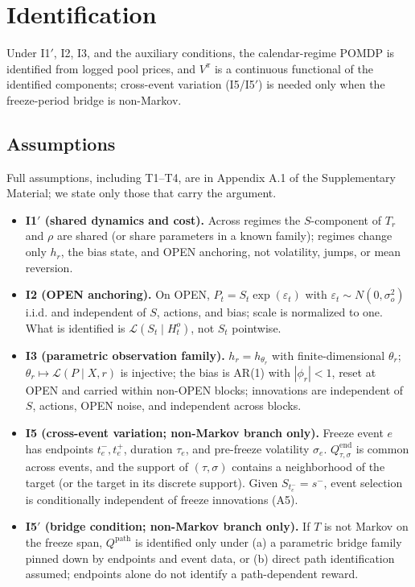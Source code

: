 \section{Identification}\label{sec:identification}

Under I1$'$, I2, I3, and the auxiliary conditions, the calendar-regime POMDP is identified from logged pool prices, and $V^\pi$ is a continuous functional of the identified components; cross-event variation (I5/I5$'$) is needed only when the freeze-period bridge is non-Markov.

\subsection{Assumptions}

Full assumptions, including T1--T4, are in Appendix A.1 of the Supplementary Material; we state only those that carry the argument.

\begin{itemize}
\item \textbf{I1$'$ (shared dynamics and cost).} Across regimes the $S$-component of $T_r$ and $\rho$ are shared (or share parameters in a known family); regimes change only $h_r$, the bias state, and OPEN anchoring, not volatility, jumps, or mean reversion.
\item \textbf{I2 (OPEN anchoring).} On OPEN, $P_t=S_t\exp(\varepsilon_t)$ with $\varepsilon_t\sim N(0,\sigma_o^2)$ i.i.d. and independent of $S$, actions, and bias; scale is normalized to one. What is identified is $\mathcal L(S_t\mid H_t^o)$, not $S_t$ pointwise.
\item \textbf{I3 (parametric observation family).} $h_r=h_{\theta_r}$ with finite-dimensional $\theta_r$; $\theta_r\mapsto\mathcal L(P\mid X,r)$ is injective; the bias is AR(1) with $|\phi_r|<1$, reset at OPEN and carried within non-OPEN blocks; innovations are independent of $S$, actions, OPEN noise, and independent across blocks.
\item \textbf{I5 (cross-event variation; non-Markov branch only).} Freeze event $e$ has endpoints $t_e^-,t_e^+$, duration $\tau_e$, and pre-freeze volatility $\sigma_e$. $Q^{\mathrm{end}}_{\tau,\sigma}$ is common across events, and the support of $(\tau,\sigma)$ contains a neighborhood of the target (or the target in its discrete support). Given $S_{t_e^-}=s^-$, event selection is conditionally independent of freeze innovations (A5).
\item \textbf{I5$'$ (bridge condition; non-Markov branch only).} If $T$ is not Markov on the freeze span, $Q^{\mathrm{path}}$ is identified only under (a) a parametric bridge family pinned down by endpoints and event data, or (b) direct path identification assumed; endpoints alone do not identify a path-dependent reward.
\end{itemize}

